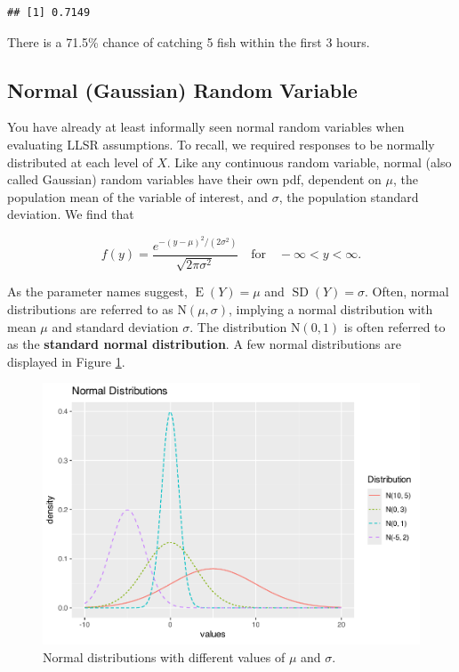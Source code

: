 \documentclass[
]{krantz}
\newcommand{\E}{\operatorname{E}}
\newcommand{\SD}{\operatorname{SD}}
\begin{document}
\begin{verbatim}
## [1] 0.7149
\end{verbatim}

There is a 71.5\% chance of catching 5 fish within the first 3 hours.

\subsection{Normal (Gaussian) Random Variable}\label{normal-gaussian-random-variable}

You have already at least informally seen normal random variables when evaluating LLSR assumptions. To recall, we required responses to be normally distributed at each level of \(X\). Like any continuous random variable, normal (also called Gaussian) random variables have their own pdf, dependent on \(\mu\), the population mean of the variable of interest, and \(\sigma\), the population standard deviation. We find that

\begin{equation}
f(y) =  \frac{e^{-(y-\mu)^2/ (2 \sigma^2)}}{\sqrt{2\pi\sigma^2}} \quad \textrm{for} \quad -\infty < y < \infty.
\label{eq:normalRV}
\end{equation}

As the parameter names suggest, \(\E(Y) = \mu\) and \(\SD(Y) = \sigma\). Often, normal distributions are referred to as \(\textrm{N}(\mu, \sigma)\), implying a normal distribution  with mean \(\mu\) and standard deviation \(\sigma\). The distribution \(\textrm{N}(0,1)\) is often referred to as the \textbf{standard normal distribution}. A few normal distributions are displayed in Figure \ref{fig:multNorm}.



\begin{figure}

{\centering \includegraphics[width=0.6\linewidth]{bookdown-BeyondMLR_files/figure-latex/multNorm-1} 

}

\caption{Normal distributions with different values of \(\mu\) and \(\sigma\).}\label{fig:multNorm}
\end{figure}
\end{document}
